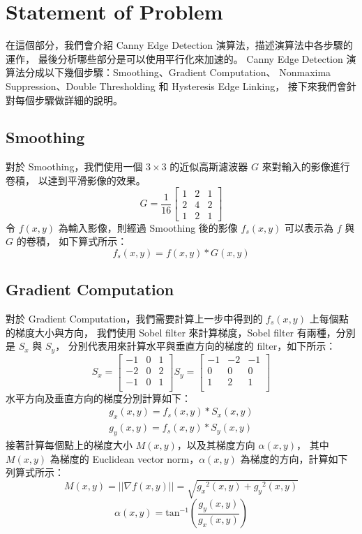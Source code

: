 \documentclass[sigconf,nonacm]{acmart}
\begin{document}
\section{Statement of Problem}

在這個部分，我們會介紹 Canny Edge Detection 演算法，描述演算法中各步驟的運作，
最後分析哪些部分是可以使用平行化來加速的。
Canny Edge Detection 演算法分成以下幾個步驟：Smoothing、Gradient Computation、
Nonmaxima Suppression、Double Thresholding 和 Hysteresis Edge Linking，
接下來我們會針對每個步驟做詳細的說明。

\subsection{Smoothing} \label{Smoothing}

對於 Smoothing，我們使用一個 $3\times3$ 的近似高斯濾波器 $G$ 來對輸入的影像進行卷積，
以達到平滑影像的效果。
$$G=\frac{1}{16}
\begin{bmatrix}
1 & 2 & 1 \\2 & 4 & 2 \\
1 & 2 & 1
\end{bmatrix}$$
令 $f(x, y)$ 為輸入影像，則經過 Smoothing 後的影像 $f_s(x, y)$ 可以表示為 $f$ 與 $G$ 的卷積，
如下算式所示：
$$f_s(x, y)=f(x, y)*G(x, y)$$

\subsection{Gradient Computation}

對於 Gradient Computation，我們需要計算上一步中得到的 $f_s(x, y)$ 上每個點的梯度大小與方向，
我們使用 Sobel filter 來計算梯度，Sobel filter 有兩種，分別是 $S_x$ 與 $S_y$，
分別代表用來計算水平與垂直方向的梯度的 filter，如下所示：
$$S_x=\begin{bmatrix} -1 & 0 & 1 \\ -2 & 0 & 2 \\ -1 & 0 & 1 \\ \end{bmatrix} S_y=\begin{bmatrix} -1 & -2 & -1 \\ 0 & 0 & 0 \\ 1 & 2 & 1 \\ \end{bmatrix}$$
水平方向及垂直方向的梯度分別計算如下：
\begin{align*}
  g_x(x, y)=f_s(x, y)*S_x(x, y)\\
  g_y(x, y)=f_s(x, y)*S_y(x, y)
\end{align*}
接著計算每個點上的梯度大小 $M(x, y)$，以及其梯度方向 $\alpha(x, y)$，
其中 $M(x, y)$ 為梯度的 Euclidean vector norm，$\alpha(x, y)$ 為梯度的方向，計算如下列算式所示：
$$M(x, y)=||\nabla f(x, y)||=\sqrt {{g_x}^2(x, y)+{g_y}^2(x, y)}$$
$$\alpha(x, y)=\text{tan}^{-1}(\frac{g_y(x, y)}{g_x(x, y)})$$
\end{document}
